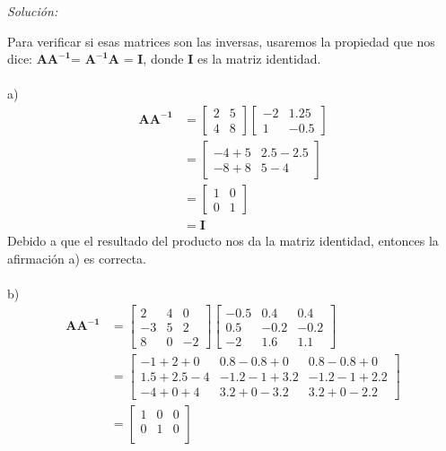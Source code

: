 \documentclass[12pt]{article}
\newenvironment{sol}
    {\emph{Solución:}
    }
    {
    }
\begin{document}
\begin{sol}
Para verificar si esas matrices son las inversas, usaremos la propiedad que nos dice:
$\mathbf{AA^{-1}}$= $\mathbf{A^{-1}A}$ = \textbf{I}, donde \textbf{I} es la matriz identidad.\\ \\
a) 
\begin{align*}
\mathbf{AA^{-1}} &= 
\begin{bmatrix} 
2 & 5 \\
4 & 8 
\end{bmatrix} 
\begin{bmatrix}
-2 & 1.25 \\ 
1 & -0.5
\end{bmatrix}\\
&= 
\begin{bmatrix}
-4 + 5 & 2.5 - 2.5 \\
-8 + 8 & 5 - 4
\end{bmatrix}\\
&= 
\begin{bmatrix}
1 & 0 \\
0 & 1
\end{bmatrix}\\
&= \mathbf{I}
\end{align*}
Debido a que el resultado del producto nos da la matriz identidad, entonces la afirmación a) es correcta. \\ \\ 
b)
\begin{align*}
\mathbf{AA^{-1}} &= 
\begin{bmatrix}
2&4&0\\
-3&5&2\\
8&0&-2
\end{bmatrix}
\begin{bmatrix}
-0.5 & 0.4 & 0.4\\
0.5 & -0.2 & -0.2\\
-2 & 1.6 & 1.1
\end{bmatrix} \\
&=
\begin{bmatrix}
-1 + 2 + 0 & 0.8 - 0.8 + 0 & 0.8 - 0.8 + 0 \\
1.5 + 2.5 - 4 & -1.2 - 1 + 3.2 & -1.2 - 1 + 2.2 \\
-4 + 0 + 4 & 3.2 + 0 - 3.2 & 3.2 + 0 - 2.2
\end{bmatrix}
\\ &=
\begin{bmatrix}
1 & 0 & 0 \\
0 & 1 & 0 \\

\end{bmatrix}
\end{align*}
\end{sol}
\end{document}
